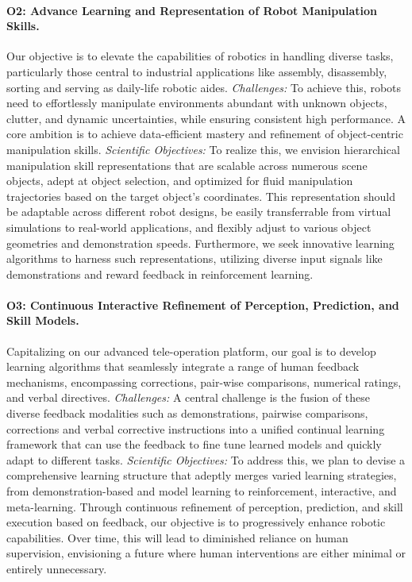 \begin{refsection}
\paragraph{O2: Advance Learning and Representation of Robot Manipulation Skills.}  Our objective is to elevate the capabilities of robotics in handling diverse tasks, particularly those central to industrial applications like assembly, disassembly, sorting and serving as daily-life robotic aides. \newline
\textit{Challenges:} To achieve this, robots need to effortlessly manipulate environments abundant with unknown objects, clutter, and dynamic uncertainties, while ensuring consistent high performance. A core ambition is to achieve data-efficient mastery and refinement of object-centric manipulation skills. \newline
\textit{Scientific Objectives:} To realize this, we envision hierarchical manipulation skill representations that are scalable across numerous scene objects, adept at object selection, and optimized for fluid manipulation trajectories based on the target object's coordinates. This representation should be adaptable across different robot designs, be easily transferrable from virtual simulations to real-world applications, and flexibly adjust to various object geometries and demonstration speeds. Furthermore, we seek innovative learning algorithms to harness such representations, utilizing diverse input signals like demonstrations and reward feedback in reinforcement learning. \newline
\vspace{-0.5cm}
\paragraph{O3: Continuous Interactive Refinement of Perception, Prediction, and Skill Models.} Capitalizing on our advanced tele-operation platform, our goal is to develop learning algorithms that seamlessly integrate a range of human feedback mechanisms, encompassing corrections, pair-wise comparisons, numerical ratings, and verbal directives. \newline
\textit{Challenges:} A central challenge is the fusion of these diverse feedback modalities such as demonstrations, pairwise comparisons, corrections and verbal corrective instructions into a unified continual learning framework that can use the feedback to fine tune learned models and quickly adapt to different tasks. \newline
\textit{Scientific Objectives:} To address this, we plan to devise a comprehensive learning structure that adeptly merges varied learning strategies, from demonstration-based and model learning to reinforcement, interactive, and meta-learning. Through continuous refinement of perception, prediction, and skill execution based on feedback, our objective is to progressively enhance robotic capabilities. Over time, this will lead to diminished reliance on human supervision, envisioning a future where human interventions are either minimal or entirely unnecessary.


\end{refsection}
